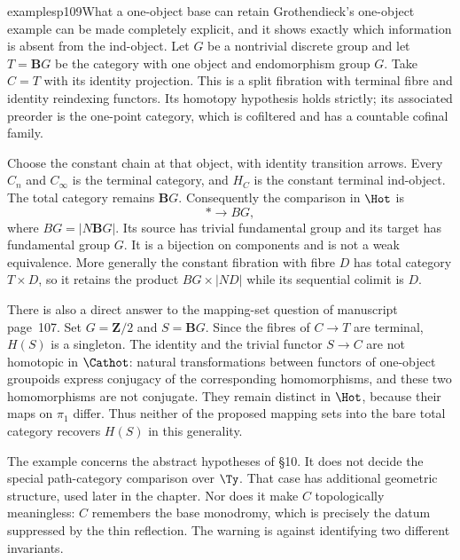 \begin{dcomment}{examples}{p109}{What a one-object base can retain}
Grothendieck's one-object example can be made completely explicit, and it shows exactly which information is absent from the ind-object. Let $G$ be a nontrivial discrete group and let $T=\mathbf BG$ be the category with one object and endomorphism group $G$. Take $C=T$ with its identity projection. This is a split fibration with terminal fibre and identity reindexing functors. Its homotopy hypothesis holds strictly; its associated preorder is the one-point category, which is cofiltered and has a countable cofinal family.

Choose the constant chain at that object, with identity transition arrows. Every $C_n$ and $C_\infty$ is the terminal category, and $H_C$ is the constant terminal ind-object. The total category remains $\mathbf BG$. Consequently the comparison in $\Hot$ is
\[
 *\longrightarrow BG,
\]
where $BG=|N\mathbf BG|$. Its source has trivial fundamental group and its target has fundamental group $G$. It is a bijection on components and is not a weak equivalence. More generally the constant fibration with fibre $D$ has total category $T\times D$, so it retains the product $BG\times|ND|$ while its sequential colimit is $D$.

There is also a direct answer to the mapping-set question of manuscript page~107. Set $G=\mathbf Z/2$ and $S=\mathbf BG$. Since the fibres of $C\to T$ are terminal, $H(S)$ is a singleton. The identity and the trivial functor $S\to C$ are not homotopic in $\Cathot$: natural transformations between functors of one-object groupoids express conjugacy of the corresponding homomorphisms, and these two homomorphisms are not conjugate. They remain distinct in $\Hot$, because their maps on $\pi_1$ differ. Thus neither of the proposed mapping sets into the bare total category recovers $H(S)$ in this generality.

The example concerns the abstract hypotheses of \S10. It does not decide the special path-category comparison over $\Ty$. That case has additional geometric structure, used later in the chapter. Nor does it make $C$ topologically meaningless: $C$ remembers the base monodromy, which is precisely the datum suppressed by the thin reflection. The warning is against identifying two different invariants.
\end{dcomment}

